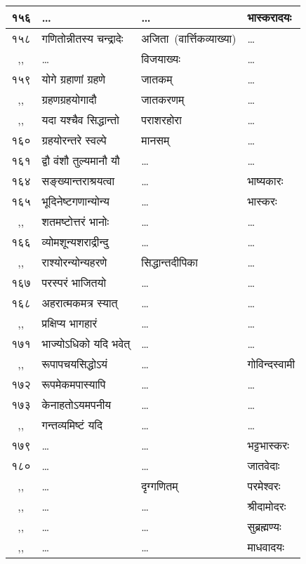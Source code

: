 \documentclass[11pt, openany]{book}
\begin{document}
\begin{center}
\begin{longtable}{|c|p{4.2cm}|p{3cm}|p{2.7cm}|}
		\hline
		१५६ & \ldots  & \ldots  & भास्करादयः \\
		\hline
		१५८ & गणितोन्नीतस्य चन्द्रादेः\textemdash  & अजिता~(वार्त्तिकव्याख्या) & \ldots \\
		\hline
		,, & \ldots  & विजयाख्यः & \ldots \\
		\hline
		१५९ & योगे ग्रहाणां ग्रहणे\textemdash & जातकम्  & \ldots  \\
		\hline
		,, & ग्रहणग्रहयोगादौ\textemdash  & जातकरणम्  & \ldots \\
		\hline
		,, & यदा यश्चैव सिद्धान्तो\textemdash & पराशरहोरा  & \ldots \\
		\hline
		१६०  &  ग्रहयोरन्तरे स्वल्पे\textemdash & मानसम्  & \ldots \\
		\hline
		१६१ & द्वौ वंशौ तुल्यमानौ यौ\textemdash & \ldots  & \ldots \\
		\hline
		१६४ & सङ्ख्यान्तराश्रयत्वा\textemdash & \ldots  & भाष्यकारः \\
		\hline
		१६५ & भूदिनेष्टगणान्योन्य\textemdash & \ldots  & भास्करः \\
		\hline
		,, & शतमष्टोत्तरं भानोः\textemdash & \ldots  & \ldots \\
		\hline
		१६६  & व्योमशून्यशराद्रीन्दु\textemdash & \ldots & \ldots \\
		\hline
		,, & राश्योरन्योन्यहरणे\textemdash & सिद्धान्तदीपिका   & \ldots \\
		\hline
		१६७  & परस्परं भाजितयो\textemdash & \ldots  & \ldots \\
		\hline
		१६८ & अहरात्मकमत्र स्यात्\textemdash  & \ldots  & \ldots  \\
		\hline
		,,  &  प्रक्षिप्य भागहारं\textemdash  & \ldots  & \ldots \\
		\hline
		१७१  & भाज्योऽधिको यदि भवेत्\textemdash & \ldots   & \ldots \\
		\hline
		,, & रूपापचयसिद्धोऽयं\textemdash & \ldots  &  गोविन्दस्वामी \\
		\hline
		१७२ & रूपमेकमपास्यापि\textemdash  & \ldots  & \ldots \\
		\hline
		१७३ & केनाहतोऽयमपनीय\textemdash  & \ldots  &\ldots \\
		\hline
		,, & गन्तव्यमिष्टं यदि\textemdash  & \ldots  &   \ldots \\
		\hline
		१७९ & \ldots  & \ldots  & भट्टभास्करः \\
		\hline
		१८० & \ldots  & \ldots  & जातवेदाः  \\
		\hline
		,, & \ldots  & दृग्गणितम्  & परमेश्वरः \\
		\hline
		,, & \ldots  & \ldots  & श्रीदामोदरः \\
		\hline
		,, & \ldots  & \ldots  & सुब्रह्मण्यः \\
		\hline
		,, & \ldots  & \ldots  &  माधवादयः \\
		\hline
		
	\end{longtable}
\end{center}
\end{document}
